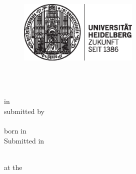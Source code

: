 \begin{titlepage}
\pagestyle{empty}

\begin{figure}[ht]
\includegraphics[height=3cm]{content/pictures/hd_siegel.eps}
\end{figure}


\begin{center}
	\renewcommand{\baselinestretch}{2.00}
	\Large\sffamily
	\docFakultaet \\
	\large \docUniversitaet
	\par\vfill\normalfont
	\docArtDerArbeit \\
	in \docStudiengang\\
	submitted by\\
	\docVorname~\docNachname\\
	born in \docGeburtsort\\
	Submitted in \docAbgabejahr
\end{center}
\newpage


\begin{center}
{\fontsize{18}{22} \selectfont \docArtDerArbeit}\\[5mm]
{\fontsize{18}{22} \selectfont at the} \\[5mm]
{\fontsize{18}{22} \selectfont \docInstitut}\\
\vspace{1cm}
\begin{onehalfspace}
{\fontsize{22}{26} \selectfont \textbf{\docTitle}}\\[5mm]
{\fontsize{18}{22} \selectfont \docUntertitle}


\end{onehalfspace}
\end{center}


\end{titlepage}
